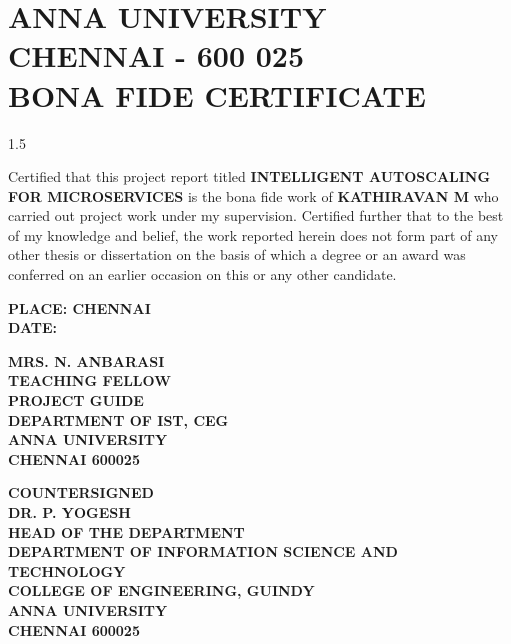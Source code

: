 \documentclass[13 pt,a4paper]{aureportm}
\begin{document}
\chapter*{ANNA UNIVERSITY\\
CHENNAI - 600 025\\
BONA FIDE CERTIFICATE}
\newlength{\aulength}
\settowidth{\aulength}{Anna University
  Chennai}
\newlength{\datewidth}
\settowidth{\datewidth}{Chennai 600 025}

\begin{spacing}{1.5}
  \begin{sloppypar}
  \fontsize{13}{14.5}\selectfont Certified that this project report titled \textbf{INTELLIGENT AUTOSCALING FOR MICROSERVICES} is the bona fide work of \textbf{KATHIRAVAN M} who carried out project work under my supervision. Certified further that to the best of my knowledge and belief, the work reported herein does not form part of any other thesis or dissertation on the basis of which a degree or an award was conferred on an earlier occasion on this or any other candidate.
  \end{sloppypar}
\end{spacing}
\vspace{0.3 cm}
\begin{flushleft}
 \parbox[t]{6 cm}{\small{\textbf{PLACE: CHENNAI}}\\
 \small{\textbf{DATE: }}}
 \hfill
 \parbox[t]{6 cm}{
 \raggedleft
 \small{\textbf{MRS. N. ANBARASI}} \\
 \small{\textbf{TEACHING FELLOW}}\\
 \small{\textbf{PROJECT GUIDE}}\\
 \small{\textbf{DEPARTMENT OF IST, CEG}}\\
 \small{\textbf{ANNA UNIVERSITY}}   \\
 \small{\textbf{CHENNAI  600025}}
 }
\end{flushleft}
\begin{center}
 \small{\textbf{COUNTERSIGNED}}\\
  \vspace{1.5 cm}
  \textbf{\small{DR. P. YOGESH}}\\
  \small{\textbf{HEAD OF THE DEPARTMENT}}\\
 \small{\textbf{DEPARTMENT OF INFORMATION SCIENCE AND TECHNOLOGY}}\\
 \small{\textbf{COLLEGE OF ENGINEERING, GUINDY}}\\
 \small{\textbf{ANNA UNIVERSITY}}   \\
 \small{\textbf{CHENNAI  600025}}
\end{center}
\end{document}
